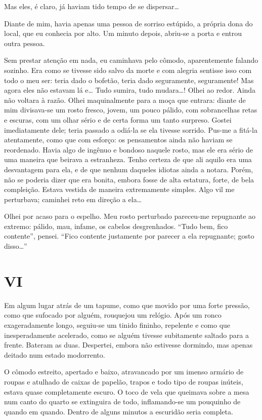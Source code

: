 Mas eles, é claro, já haviam tido tempo de se dispersar\ldots{}

Diante de mim, havia apenas uma pessoa de sorriso estúpido, a própria
dona do local, que eu conhecia por alto. Um minuto depois, abriu-se a
porta e entrou outra pessoa.

Sem prestar atenção em nada, eu caminhava pelo cômodo, aparentemente
falando sozinho. Era como se tivesse sido salvo da morte e com alegria
sentisse isso com todo o meu ser: teria dado o bofetão, teria dado
seguramente, seguramente! Mas agora eles não estavam lá e\ldots{} Tudo
sumira, tudo mudara\ldots{}! Olhei ao redor. Ainda não voltara à razão.
Olhei maquinalmente para a moça que entrara: diante de mim divisava-se
um rosto fresco, jovem, um pouco pálido, com sobrancelhas retas e
escuras, com um olhar sério e de certa forma um tanto surpreso. Gostei
imediatamente dele; teria passado a odiá-la se ela tivesse sorrido.
Pus-me a fitá-la atentamente, como que com esforço: os pensamentos
ainda não haviam se reordenado. Havia algo de ingênuo e bondoso naquele
rosto, mas ele era sério de uma maneira que beirava a estranheza. Tenho
certeza de que ali aquilo era uma desvantagem para ela, e de que nenhum
daqueles idiotas ainda a notara. Porém, não se poderia dizer que era
bonita, embora fosse de alta estatura, forte, de bela compleição.
Estava vestida de maneira extremamente simples. Algo vil me perturbava;
caminhei reto em direção a ela\ldots{}

Olhei por acaso para o espelho. Meu rosto perturbado pareceu-me
repugnante ao extremo: pálido, mau, infame, os cabelos desgrenhados.
“Tudo bem, fico contente”, pensei. “Fico contente justamente por
parecer a ela repugnante; gosto disso\ldots{}”


\section{VI}

Em algum lugar atrás de um tapume, como que movido por uma forte
pressão, como que sufocado por alguém, rouquejou um relógio. Após um
ronco exageradamente longo, seguiu-se um tinido fininho, repelente e
como que inesperadamente acelerado, como se alguém tivesse subitamente
saltado para a frente. Bateram as duas. Despertei, embora não estivesse
dormindo, mas apenas deitado num estado modorrento.

O cômodo estreito, apertado e baixo, atravancado por um imenso armário
de roupas e atulhado de caixas de papelão, trapos e todo tipo de roupas
inúteis, estava quase completamente escuro. O toco de vela que queimava
sobre a mesa num canto do quarto se extinguira de todo, inflamando-se
um pouquinho de quando em quando. Dentro de alguns minutos a escuridão
seria completa.

